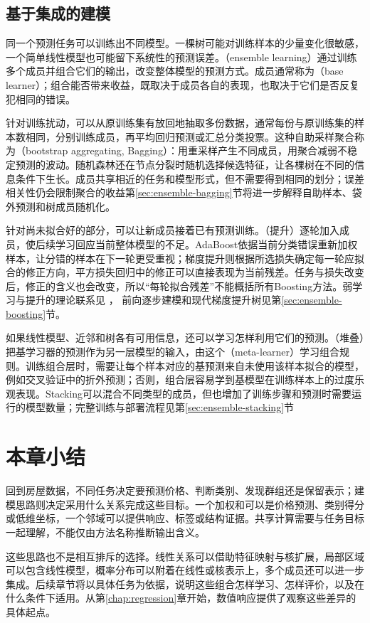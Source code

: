 \subsection{基于集成的建模}
\label{sec:classic-overview-ensemble}

同一个预测任务可以训练出不同模型。一棵树可能对训练样本的少量变化很敏感，一个简单线性模型也可能留下系统性的预测误差。（ensemble learning）通过训练多个成员并组合它们的输出，改变整体模型的预测方式。成员通常称为（base learner）；组合能否带来收益，既取决于成员各自的表现，也取决于它们是否反复犯相同的错误。

针对训练扰动，可以从原训练集有放回地抽取多份数据，通常每份与原训练集的样本数相同，分别训练成员，再平均回归预测或汇总分类投票。这种自助采样聚合称为（bootstrap aggregating, Bagging）：用重采样产生不同成员，用聚合减弱不稳定预测的波动。随机森林还在节点分裂时随机选择候选特征，让各棵树在不同的信息条件下生长。成员共享相近的任务和模型形式，但不需要得到相同的划分；误差相关性仍会限制聚合的收益第\ref{sec:ensemble-bagging}节将进一步解释自助样本、袋外预测和树成员随机化。

针对尚未拟合好的部分，可以让新成员接着已有预测训练。（提升）逐轮加入成员，使后续学习回应当前整体模型的不足。AdaBoost依据当前分类错误重新加权样本，让分错的样本在下一轮更受重视；梯度提升则根据所选损失确定每一轮应拟合的修正方向，平方损失回归中的修正可以直接表现为当前残差。任务与损失改变后，修正的含义也会改变，所以“每轮拟合残差”不能概括所有Boosting方法。弱学习与提升的理论联系见
，
前向逐步建模和现代梯度提升树见第\ref{sec:ensemble-boosting}节。

如果线性模型、近邻和树各有可用信息，还可以学习怎样利用它们的预测。（堆叠）把基学习器的预测作为另一层模型的输入，由这个（meta-learner）学习组合规则。训练组合层时，需要让每个样本对应的基预测来自未使用该样本拟合的模型，例如交叉验证中的折外预测；否则，组合层容易学到基模型在训练样本上的过度乐观表现。Stacking可以混合不同类型的成员，但也增加了训练步骤和预测时需要运行的模型数量；完整训练与部署流程见第\ref{sec:ensemble-stacking}节

\section{本章小结}
\label{sec:classic-overview-summary}

回到房屋数据，不同任务决定要预测价格、判断类别、发现群组还是保留表示；建模思路则决定采用什么关系完成这些目标。一个加权和可以是价格预测、类别得分或低维坐标，一个邻域可以提供响应、标签或结构证据。共享计算需要与任务目标一起理解，不能仅由方法名称推断输出含义。

这些思路也不是相互排斥的选择。线性关系可以借助特征映射与核扩展，局部区域可以包含线性模型，概率分布可以附着在线性或核表示上，多个成员还可以进一步集成。后续章节将以具体任务为依据，说明这些组合怎样学习、怎样评价，以及在什么条件下适用。从第\ref{chap:regression}章开始，数值响应提供了观察这些差异的具体起点。
